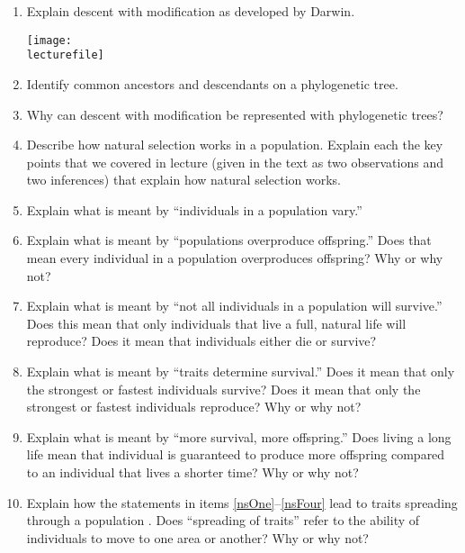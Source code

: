 \documentclass[letterpaper]{tufte-handout}
\newcommand\lecturefile{163_lecture05_fullsize}
\begin{document}
\begin{enumerate}

	\item Explain descent with modification as developed by Darwin. 
	\begin{marginfigure}
		\texttt{[image: \\lecturefile]}
	\end{marginfigure}

	\item Identify common ancestors and descendants on a phylogenetic tree.

	\item Why can descent with modification be represented with phylogenetic trees? 

	\item Describe how natural selection works in a population. Explain each the key points that we covered in lecture (given in the text as two observations and two inferences) that explain how natural selection works.

	\item\label{nsOne} Explain what is meant by ``individuals in a population vary.''

	\item Explain what is meant by ``populations overproduce offspring.'' Does that mean every individual in a population overproduces offspring? Why or why not?

	\item Explain what is meant by ``not all individuals in a population will survive.'' Does this mean that only individuals that live a full, natural life will reproduce? Does it mean that individuals either die or survive?

	\item Explain what is meant by ``traits determine survival.'' Does it mean that only the strongest or fastest individuals survive? Does it mean that only the strongest or fastest individuals reproduce? Why or why not?

	\item\label{nsFour} Explain what is meant by ``more survival, more offspring.'' Does living a long life mean that individual is guaranteed to produce more offspring compared to an individual that lives a shorter time? Why or why not? 

	\item Explain how the statements in items \ref{nsOne}--\ref{nsFour} lead to traits spreading through a population%
	. 
	Does “spreading of traits” refer to the ability of individuals to move to one area or another? Why or why not?


\end{enumerate}
\end{document}
